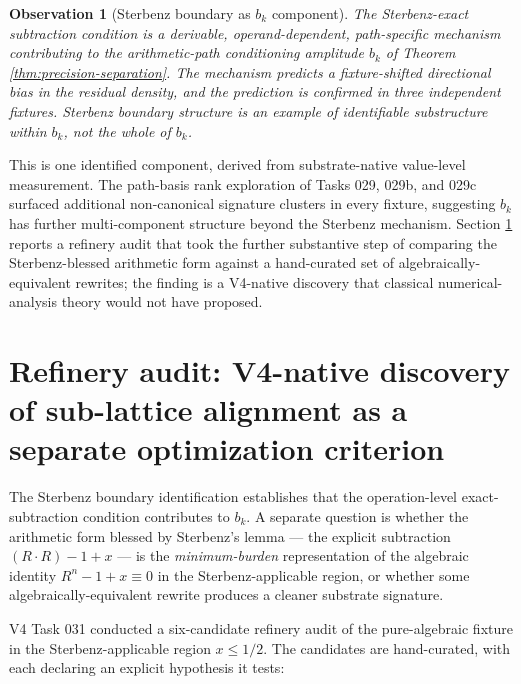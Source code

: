 \documentclass[11pt,a4paper]{article}
\newtheorem{observation}[theorem]{Observation}
\begin{document}
\begin{observation}[Sterbenz boundary as $b_k$ component]\label{obs:sterbenz-component}
The Sterbenz-exact subtraction condition is a derivable, operand-dependent, path-specific mechanism contributing to the arithmetic-path conditioning amplitude $b_k$ of Theorem \ref{thm:precision-separation}. The mechanism predicts a fixture-shifted directional bias in the residual density, and the prediction is confirmed in three independent fixtures. Sterbenz boundary structure is an example of identifiable substructure within $b_k$, not the whole of $b_k$.
\end{observation}

This is one identified component, derived from substrate-native value-level measurement. The path-basis rank exploration of Tasks 029, 029b, and 029c surfaced additional non-canonical signature clusters in every fixture, suggesting $b_k$ has further multi-component structure beyond the Sterbenz mechanism. Section \ref{sec:refinery} reports a refinery audit that took the further substantive step of comparing the Sterbenz-blessed arithmetic form against a hand-curated set of algebraically-equivalent rewrites; the finding is a V4-native discovery that classical numerical-analysis theory would not have proposed.

\section{Refinery audit: V4-native discovery of sub-lattice alignment as a separate optimization criterion}\label{sec:refinery}

The Sterbenz boundary identification establishes that the operation-level exact-subtraction condition contributes to $b_k$. A separate question is whether the arithmetic form blessed by Sterbenz's lemma --- the explicit subtraction $(R \cdot R) - 1 + x$ --- is the \emph{minimum-burden} representation of the algebraic identity $R^n - 1 + x \equiv 0$ in the Sterbenz-applicable region, or whether some algebraically-equivalent rewrite produces a cleaner substrate signature.

V4 Task 031 conducted a six-candidate refinery audit of the pure-algebraic fixture in the Sterbenz-applicable region $x \le 1/2$. The candidates are hand-curated, with each declaring an explicit hypothesis it tests:
\end{document}
